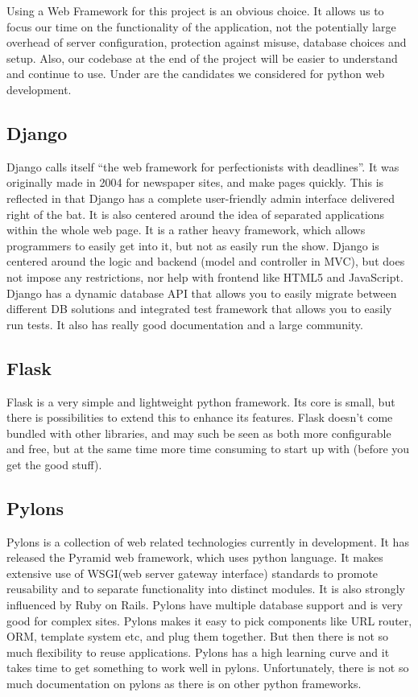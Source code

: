 \documentclass{report}
\begin{document}
Using a Web Framework for this project is an obvious choice. It allows us to focus our time on the functionality of the application, not the potentially large overhead of server configuration, protection against misuse, database choices and setup. Also, our codebase at the end of the project will be easier to understand and continue to use. 
Under are the candidates we considered for python web development.

\subsection{Django}
Django calls itself “the web framework for perfectionists with deadlines”. It was originally made in 2004 for newspaper sites, and make pages quickly\cite{website:django}. This is reflected in that Django has a complete user-friendly admin interface delivered right of the bat. It is also centered around the idea of separated applications within the whole web page. It is a rather heavy framework, which allows programmers to easily get into it, but not as easily run the show. Django is centered around the logic and backend (model and controller in MVC), but does not impose any restrictions, nor help with frontend like HTML5 and JavaScript. Django has a dynamic database API that allows you to easily migrate between different DB solutions and integrated test framework that allows you to easily run tests. It also has really good documentation and a large community.

\subsection{Flask}
Flask is a very simple and lightweight python framework\cite{website:flask}. Its core is small, but there is possibilities to extend this to enhance its features. Flask doesn’t come bundled with other libraries, and may such be seen as both more configurable and free, but at the same time more time consuming to start up with (before you get the good stuff). 

\subsection{Pylons}
Pylons is a collection of web related technologies currently in development. It has released the Pyramid web framework, which uses python language\cite{website:pylons}. It makes extensive use of WSGI(web server gateway interface) standards to promote reusability and to separate functionality into distinct modules. It is also strongly influenced by Ruby on Rails. Pylons have multiple database support and is very good for complex sites. Pylons makes it easy to pick components like URL router, ORM, template system etc, and plug them together. But then there is not so much flexibility to reuse applications. Pylons has a high learning curve and it takes time to get something to work well in pylons. Unfortunately, there is not so much documentation on pylons as there is on other python frameworks.
\end{document}
